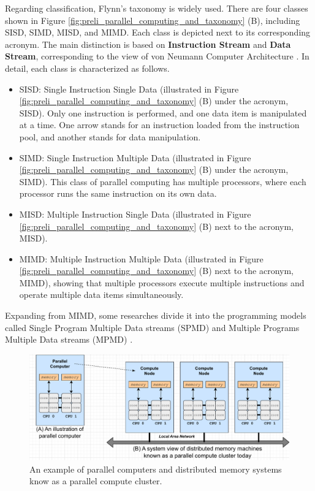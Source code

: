 Regarding classification, Flynn's taxonomy \cite{kumar1994intro} is widely used. There are four classes shown in Figure \ref{fig:preli_parallel_computing_and_taxonomy} (B), including SISD, SIMD, MISD, and MIMD. Each class is depicted next to its corresponding acronym. The main distinction is based on \textbf{Instruction Stream} and \textbf{Data Stream}, corresponding to the view of von Neumann Computer Architecture \cite{eigenmann1999vonneumanarch}. In detail, each class is characterized as follows.

\begin{itemize}
	\item SISD: Single Instruction Single Data (illustrated in Figure \ref{fig:preli_parallel_computing_and_taxonomy} (B) under the acronym, SISD). Only one instruction is performed, and one data item is manipulated at a time. One arrow stands for an instruction loaded from the instruction pool, and another stands for data manipulation.
	
	\item SIMD: Single Instruction Multiple Data (illustrated in Figure \ref{fig:preli_parallel_computing_and_taxonomy} (B) under the acronym, SIMD). This class of parallel computing has multiple processors, where each processor runs the same instruction on its own data.
	
	\item MISD: Multiple Instruction Single Data (illustrated in Figure \ref{fig:preli_parallel_computing_and_taxonomy} (B) next to the acronym, MISD).
	
	\item MIMD: Multiple Instruction Multiple Data (illustrated in Figure \ref{fig:preli_parallel_computing_and_taxonomy} (B) next to the acronym, MIMD), showing that multiple processors execute multiple instructions and operate multiple data items simultaneously.
\end{itemize}

Expanding from MIMD, some researches divide it into the programming models called Single Program Multiple Data streams (SPMD) \cite{daerma2001spmdmodel} and Multiple Programs Multiple Data streams (MPMD) \cite{fzj2023mpmdmodel}.\\

\begin{figure}[t]
  \centering
  \includegraphics[scale=0.6]{./pictures/preliminaries/preli_parallel_and_distributed_memory_machines.pdf}
	\caption{An example of parallel computers and distributed memory systems know as a parallel compute cluster.}
	\label{fig:preli_parallel_computer_and_cluster}
\end{figure}

